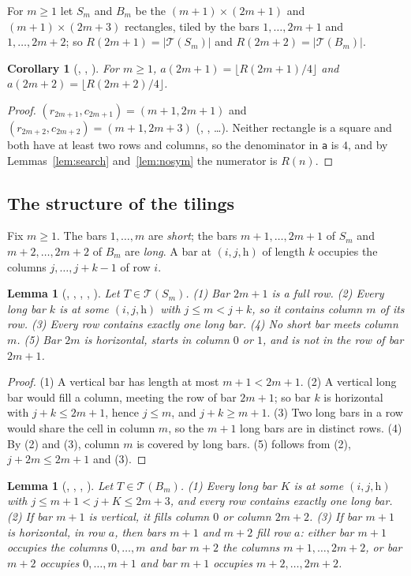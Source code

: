 \documentclass[11pt]{amsart}
\theoremstyle{plain}
\newtheorem{lemma}[theorem]{Lemma}
\newtheorem{corollary}[theorem]{Corollary}
\theoremstyle{definition}
\newcommand{\code}[1]{\texttt{#1}}
\newcommand{\T}{\mathcal{T}}
\newcommand{\Sm}{S_m}
\newcommand{\Bm}{B_m}
\begin{document}
For $m\ge1$ let $\Sm$ and $\Bm$ be the $(m+1)\times(2m+1)$ and $(m+1)\times(2m+3)$ rectangles, tiled by the bars $1,\dots,2m+1$ and $1,\dots,2m+2$; so $R(2m+1)=|\T(\Sm)|$ and $R(2m+2)=|\T(\Bm)|$.

\begin{corollary}[, , ]\label{cor:quarter}
For $m\ge1$, $a(2m+1)=\lfloor R(2m+1)/4\rfloor$ and $a(2m+2)=\lfloor R(2m+2)/4\rfloor$.
\end{corollary}

\begin{proof}
$(r_{2m+1},c_{2m+1})=(m+1,2m+1)$ and $(r_{2m+2},c_{2m+2})=(m+1,2m+3)$ (, , \dots). Neither rectangle is a square and both have at least two rows and columns, so the denominator in \code{a} is $4$, and by Lemmas~\ref{lem:search} and~\ref{lem:nosym} the numerator is $R(n)$.
\end{proof}

\subsection{The structure of the tilings}
Fix $m\ge1$. The bars $1,\dots,m$ are \emph{short}; the bars $m+1,\dots,2m+1$ of $\Sm$ and $m+2,\dots,2m+2$ of $\Bm$ are \emph{long}. A bar at $(i,j,\mathrm h)$ of length $k$ occupies the columns $j,\dots,j+k-1$ of row $i$.

\begin{lemma}[, , , , ]\label{lem:S}
Let $T\in\T(\Sm)$. (1) Bar $2m+1$ is a full row. (2) Every long bar $k$ is at some $(i,j,\mathrm h)$ with $j\le m<j+k$, so it contains column $m$ of its row. (3) Every row contains exactly one long bar. (4) No short bar meets column $m$. (5) Bar $2m$ is horizontal, starts in column $0$ or $1$, and is not in the row of bar $2m+1$.
\end{lemma}

\begin{proof}
(1) A vertical bar has length at most $m+1<2m+1$. (2) A vertical long bar would fill a column, meeting the row of bar $2m+1$; so bar $k$ is horizontal with $j+k\le2m+1$, hence $j\le m$, and $j+k\ge m+1$. (3) Two long bars in a row would share the cell in column $m$, so the $m+1$ long bars are in distinct rows. (4) By (2) and (3), column $m$ is covered by long bars. (5) follows from (2), $j+2m\le2m+1$ and (3).
\end{proof}

\begin{lemma}[, , , ]\label{lem:B}
Let $T\in\T(\Bm)$. (1) Every long bar $K$ is at some $(i,j,\mathrm h)$ with $j\le m+1<j+K\le2m+3$, and every row contains exactly one long bar. (2) If bar $m+1$ is vertical, it fills column $0$ or column $2m+2$. (3) If bar $m+1$ is horizontal, in row $a$, then bars $m+1$ and $m+2$ fill row $a$: either bar $m+1$ occupies the columns $0,\dots,m$ and bar $m+2$ the columns $m+1,\dots,2m+2$, or bar $m+2$ occupies $0,\dots,m+1$ and bar $m+1$ occupies $m+2,\dots,2m+2$.
\end{lemma}
\end{document}
